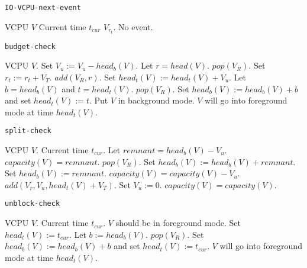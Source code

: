 \documentclass{article}
\begin{document}
\begin{algorithm}
  \caption{\tt IO-VCPU-next-event}\label{alg:iovcpu_nextevent}
  \begin{algorithmic}[1]
    \REQUIRE VCPU $V$
    \REQUIRE Current time $t_{cur}$
    \RETURN $V_{r_t}$.
    \ELSE
    \RETURN No event.
    \ENDIF
  \end{algorithmic}
\end{algorithm}

\begin{algorithm}
  \caption{\tt budget-check}
  \begin{algorithmic}[1]
    \REQUIRE VCPU $V$.
    \STATE Set $V_u:=V_u-head_b(V)$.
    \STATE Let $r=head(V)$.
    \STATE $pop(V_R)$.
    \STATE Set $r_t:=r_t+V_T$.
    \STATE $add(V_R,r)$.
    \ENDWHILE
    \STATE Set $head_t(V) := head_t(V) + V_u$.
    \STATE Let $b=head_b(V)$ and $t=head_t(V)$.
    \STATE $pop(V_R)$.
    \STATE Set $head_b(V):=head_b(V)+b$ and set $head_t(V):=t$.
    \ENDIF
    \ENDIF
    \STATE Put $V$ in background mode.
    \STATE $V$ will go into foreground mode at time $head_t(V)$.
    \ENDIF
    \ENDIF
    \ENDIF
  \end{algorithmic}
\end{algorithm}

\begin{algorithm}
  \caption{\tt split-check}
  \begin{algorithmic}[1]
    \REQUIRE VCPU $V$.
    \REQUIRE Current time $t_{cur}$.
    \STATE Let $remnant=head_b(V)-V_u$.
    \ENSURE $capacity(V)=remnant$.
    \STATE $pop(V_R)$.
    \STATE Set $head_b(V):=head_b(V)+remnant$.
    \ELSE
    \STATE Set $head_b(V):=remnant$.
    \ENSURE $capacity(V)=capacity(V)-V_u$.
    \ENDIF
    \STATE $add(V_r, V_u, head_t(V)+V_T)$.
    \STATE Set $V_u:=0$.
    \ENSURE $capacity(V)=capacity(V)$.
    \ENDIF
  \end{algorithmic}
\end{algorithm}

\begin{algorithm}
  \caption{\tt unblock-check}
  \begin{algorithmic}[1]
    \REQUIRE VCPU $V$.
    \REQUIRE Current time $t_{cur}$.
    \STATE $V$ should be in foreground mode.
    \STATE Set $head_t(V):=t_{cur}$.
    \STATE Let $b:=head_b(V)$.
    \STATE $pop(V_R)$.
    \STATE Set $head_b(V):=head_b(V)+b$ and set $head_t(V):=t_{cur}$.
    \ELSE
    \RETURN
    \ENDIF
    \ENDWHILE
    \ELSE
    \STATE $V$ will go into foreground mode at time $head_t(V)$.
    \ENDIF
  \end{algorithmic}
\end{algorithm}
\end{document}
